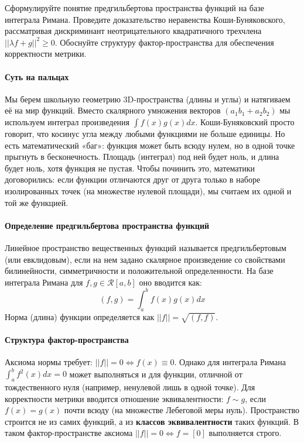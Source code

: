 {Сформулируйте понятие предгильбертова пространства функций на базе интеграла Римана. Проведите доказательство неравенства Коши-Буняковского, рассматривая дискриминант неотрицательного квадратичного трехчлена $||\lambda f+g||^2 \ge 0$. Обоснуйте структуру фактор-пространства для обеспечения корректности метрики.}

\paragraph{Суть на пальцах}
Мы берем школьную геометрию 3D-пространства (длины и углы) и натягиваем её на мир функций. Вместо скалярного умножения векторов $(a_1b_1 + a_2b_2)$ мы используем интеграл произведения $\int f(x)g(x)dx$. Коши-Буняковский просто говорит, что косинус угла между любыми функциями не больше единицы. 
Но есть математический «баг»: функция может быть всюду нулем, но в одной точке прыгнуть в бесконечность. Площадь (интеграл) под ней будет ноль, и длина будет ноль, хотя функция не пустая. Чтобы починить это, математики договорились: если функции отличаются друг от друга только в наборе изолированных точек (на множестве нулевой площади), мы считаем их одной и той же функцией.

\paragraph{Определение предгильбертова пространства функций}
Линейное пространство вещественных функций называется предгильбертовым (или евклидовым), если на нем задано скалярное произведение со свойствами билинейности, симметричности и положительной определенности. На базе интеграла Римана для $f, g \in \mathcal{R}[a, b]$ оно вводится как:
$$ (f, g) = \int_a^b f(x)g(x) dx $$
Норма (длина) функции определяется как $||f|| = \sqrt{(f, f)}$.

\paragraph{Структура фактор-пространства}
Аксиома нормы требует: $||f|| = 0 \iff f(x) \equiv 0$. Однако для интеграла Римана $\int_a^b f^2(x) dx = 0$ может выполняться и для функции, отличной от тождественного нуля (например, ненулевой лишь в одной точке). Для корректности метрики вводится отношение эквивалентности: $f \sim g$, если $f(x) = g(x)$ почти всюду (на множестве Лебеговой меры нуль). Пространство строится не из самих функций, а из \textbf{классов эквивалентности} таких функций. В таком фактор-пространстве аксиома $||f|| = 0 \iff f = [0]$ выполняется строго.

